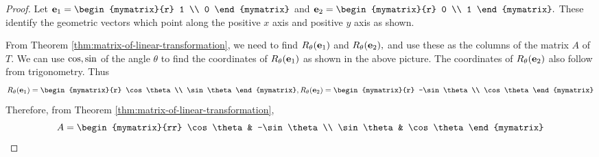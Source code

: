 \begin{proof}
Let $\vect{e}_{1} = \begin{mymatrix}{r}
1 \\
0
\end{mymatrix} $ and $\vect{e}_{2} = \begin{mymatrix}{r}
0 \\
1
\end{mymatrix} .$ These identify the geometric vectors which point along the
positive $x$ axis and positive $y$ axis as shown.

\begin{center}
\end{center}
 
From Theorem \ref{thm:matrix-of-linear-transformation}, we need to find $R_{\theta}(\mbox{\bf e}_{1})$ and $R_{\theta}(\mbox{\bf e}_{2}), $
and use these as the columns of the matrix $A$ of $T$. We can use  
$\mbox{\rm cos},\mbox{\rm sin}$ of the angle $\theta$ to find the coordinates of $R_{\theta}(\mbox{\bf e}_{1})$ as shown
in the above picture. The coordinates of $R_{\theta}(\mbox{\bf e}_{2})$ also follow from
trigonometry. Thus
\begin{equation*}
R_{\theta}(\vect{e}_{1})=\begin{mymatrix}{r}
\cos \theta \\
\sin \theta
\end{mymatrix} ,R_{\theta}(\vect{e}_{2})=\begin{mymatrix}{r}
-\sin \theta \\
\cos \theta
\end{mymatrix} 
\end{equation*}
Therefore, from Theorem \ref{thm:matrix-of-linear-transformation},
\begin{equation*}
A=\begin{mymatrix}{rr}
\cos \theta & -\sin \theta \\
\sin \theta & \cos \theta
\end{mymatrix}
\end{equation*}


\end{proof}

